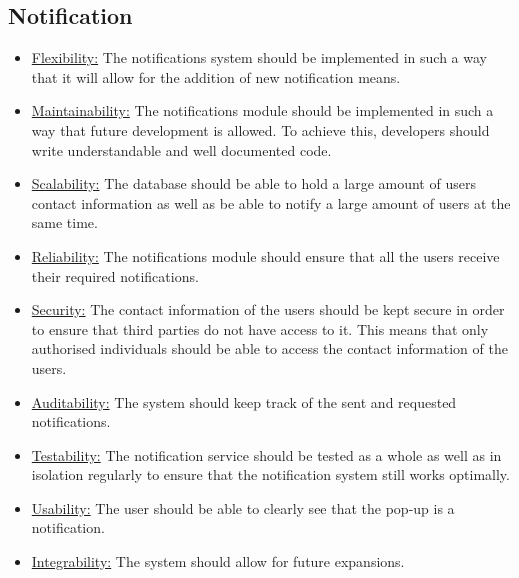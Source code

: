 \documentclass[runningheads,a4paper]{article}
\begin{document}
\subsection{Notification}
\begin{itemize}

\item \underline {Flexibility:} 
The notifications system should be implemented in such a way that it will allow for the addition of new notification means.

\item \underline {Maintainability:} The notifications module should be implemented in such a way that future development is allowed. To achieve this, developers should write understandable and well documented code.
 
\item \underline {Scalability:} 
The database should be able to hold a large amount of users contact information as well as be able to notify a large amount of users at the same time.

\item \underline {Reliability:} 
The notifications module should ensure that all the users receive their required notifications.

\item \underline {Security:}
The contact information of the users should be kept secure in order to ensure that third parties do not have access to it. This means that only authorised individuals should be able to access the contact information of the users.

\item \underline {Auditability:}
The system should keep track of the sent and requested notifications.

\item \underline {Testability:}
The notification service should be tested as a whole as well as in isolation regularly to ensure that the notification system still works optimally.

\item \underline {Usability:}
The user should be able to clearly see that the pop-up is a notification.

\item \underline {Integrability:}
The system should allow for future expansions.


\end{itemize}
\end{document}
